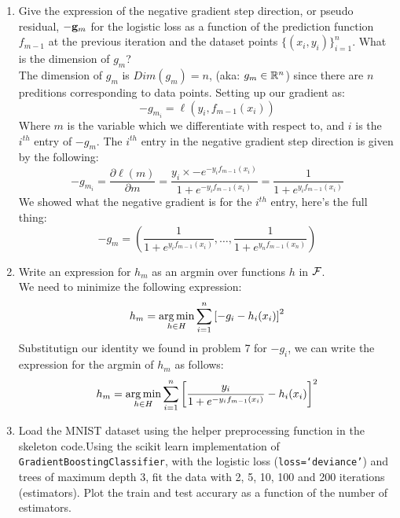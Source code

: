 \documentclass{article}
\theoremstyle{plain}
\theoremstyle{definition}
\begin{document}
\begin{enumerate}
  \setcounter{enumi}{\value{saveenum}}
  
\item Give the expression of the negative gradient step direction, or pseudo residual, $-{\bf g}_{m}$ for the logistic loss as a function of the prediction function $f_{m-1}$ at the previous iteration and the dataset points $\{(x_i, y_i)\}_{i=1}^n$. What is the dimension of $g_{m}$?\\
\subitem
The dimension of $g_{m}$ is $Dim(g_{m}) = n$, (aka: $g_m \in \mathbb{R}^n$) since there are $n$ preditions corresponding to data points.
Setting up our gradient as:
$$
    -g_{m_{i}} = \ell(y_i,f_{m-1}(x_i))
$$
 Where $m$ is the variable which we differentiate with respect to, and $i$ is the $i^{th}$ entry of $-g_m$. The $i^{th}$ entry in the negative gradient step direction is given by the following:
$$
    -g_{m_{i}} = \frac{\partial \ell(m)}{\partial m} = \frac{y_i \times - e^{-y_i f_{m-1}(x_i)}}{1 + e^{-y_i f_{m-1}(x_i)}} = \frac{1}{1 + e^{y_i f_{m-1}(x_i)}}
$$
We showed what the negative gradient is for the $i^{th}$ entry, here's the full thing:  $$-g_m = (\frac{1}{1 + e^{y_i f_{m-1}(x_i)}}, \dots, \frac{1}{1 + e^{y_n f_{m-1}(x_n)}})$$


\item Write an expression for $h_{m}$ as an argmin over functions $h$ in $\mathcal{F}$.\\

\subitem
We need to minimize the following expression:
$$
    h_m = \argmin_{h \in H} \sum_{i=1}^n \left[-g_i -  h_i(x_i)\right] ^2
$$
Substitutign our identity we found in problem 7 for $-g_i$, we can write the expression for the argmin of $h_{m}$ as follows:
$$
    h_m = \argmin_{h \in H} \sum_{i=1}^n \left[\frac{y_i}{1+e^{-y_if_{m-1}(x_i)}} -  h_i(x_i)\right] ^2
$$
  
\item Load the MNIST dataset using the helper preprocessing function in the skeleton code.Using the scikit learn implementation of \texttt{GradientBoostingClassifier}, with the logistic loss (\texttt{loss=`deviance'}) and trees of maximum depth 3, fit the data with 2, 5, 10, 100 and 200 iterations (estimators). Plot the train and test accurary as a function of the number of estimators.\\


\setcounter{saveenum}{\value{enumi}}
\end{enumerate}
\end{document}
